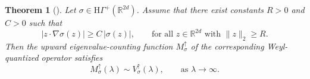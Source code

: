 \documentclass[a4paper,12pt]{article}
\newtheorem{theorem}{Theorem}%
\newcommand{\R}{\mathbb{R}}
\newcommand{\ecfup}{M^{\uparrow}}
\newcommand{\volup}{V^{\uparrow}}
\newcommand{\hypoposclass}{\mathrm{H}\Gamma^+}
\begin{document}
\begin{theorem}[{\cite[Theorem~30.1]{shubin_pseudodifferential_2001}}]
\label{thm-shubin}
Let $\sigma\in\hypoposclass(\R^{2d})$.
Assume that there exist constants $R>0$ and $C>0$ such that
\begin{equation}\label{eq:assumption-shubin}
    |z\cdot\nabla\sigma(z)| \ge C\,|\sigma(z)|,
    \qquad \text{for all } z\in\R^{2d}\text{ with }\|z\|_2\ge R.
\end{equation}
Then the upward eigenvalue-counting function $\ecfup_\sigma$ of the
corresponding Weyl-quantized operator satisfies
\[
    \ecfup_\sigma(\lambda)\sim \volup_\sigma(\lambda),
    \qquad \text{as } \lambda\to\infty.
\]
\end{theorem}

\end{document}

